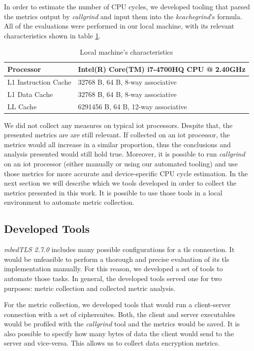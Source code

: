 \documentclass{llncs}
\begin{document}
In order to estimate the number of CPU cycles, we developed tooling that parsed the metrics output by
\textit{callgrind} and input them into the \textit{kcachegrind}'s formula. All of the evaluations were performed in
our local machine, with its relevant characteristics shown in table \ref{table:local-machine}.

\begin{table}[]
\begin{tabular}{|l|l|}
\hline
Processor            & Intel(R) Core(TM) i7-4700HQ CPU @ 2.40GHz \\ \hline
L1 Instruction Cache & 32768 B, 64 B, 8-way associative          \\ \hline
L1 Data Cache        & 32768 B, 64 B, 8-way associative          \\ \hline
LL Cache             & 6291456 B, 64 B, 12-way associative       \\ \hline
\end{tabular}
\centering \caption{\label{table:local-machine} Local machine's characteristics}
\end{table}

We did not collect any measures on typical \gls{iot} processors. Despite that, the presented metrics are are still
relevant. If collected on an \gls{iot} processor, the metrics would all increase in a similar proportion, thus
the conclusions and analysis presented would still hold true. Moreover, it is possible to run \textit{callgrind}
on an \gls{iot} processor (either manually or using our automated tooling) and use those metrics for more accurate 
and device-specific CPU cycle estimation. In the next section we will describe which we tools developed in order 
to collect the metrics presented in this work. It is possible to use those tools in a local environment to 
automate metric collection.

\subsection{Developed Tools}

\textit{mbedTLS 2.7.0} includes many possible configurations for a \gls{tls} connection. It would be unfeasible to
perform a thorough and precise evaluation of its \gls{tls} implementation manually. For this reason, we developed a set
of tools to automate those tasks. In general, the developed tools served one for two purposes: metric collection and
collected metric analysis.

For the metric collection, we developed tools that would run a client-server connection with a set of ciphersuites.
Both, the client and server executables would be profiled with the \textit{callgrind} tool and the metrics would be saved.
It is also possible to specify how many bytes of data the client would send to the server and vice-versa.
This allows us to collect data encryption metrics.
\end{document}

